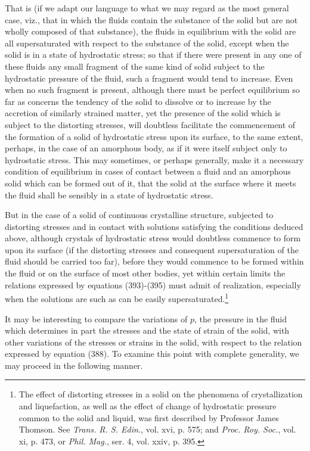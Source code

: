 \documentclass[12pt]{article}
\begin{document}
{That is (if we adapt our language to what we may regard as the most general case, viz., that in which the fluids contain the substance of the solid but are not wholly composed of that substance), the fluids in equilibrium with the solid are all supersaturated with respect to the substance of the solid, except when the solid is in a state of hydrostatic stress; so that if there were present in any one of these fluids any small fragment of the same kind of solid subject to the hydrostatic pressure of the fluid, such a fragment would tend to increase. Even when no such fragment is present, although there must be perfect equilibrium so far as concerns the tendency of the solid to dissolve or to increase by the accretion of similarly strained matter, yet the presence of the solid which is subject to the distorting stresses, will doubtless facilitate the commencement of the formation of a solid of hydrostatic stress upon its surface, to the same extent, perhaps, in the case of an amorphous body, as if it were itself subject only to hydrostatic stress. This may sometimes, or perhaps generally, make it a necessary condition of equilibrium in cases of contact between a fluid and an amorphous solid which can be formed out of it, that the solid at the surface where it meets the fluid shall be sensibly in a state of hydrostatic stress.


But in the case of a solid of continuous crystalline structure, subjected to distorting stresses and in contact with solutions satisfying the conditions deduced above, although crystals of hydrostatic stress would doubtless commence to form upon its surface (if the distorting stresses and consequent supersaturation of the fluid should be carried too far), before they would commence to be formed within the fluid or on the surface of most other bodies, yet within certain limits the relations expressed by equations (393)-(395) must admit of realization, especially when the solutions are such as can be easily supersaturated.\footnote{The effect of distorting stresses in a solid on the phenomena of crystallization and liquefaction, as well as the effect of change of hydrostatic pressure common to the solid and liquid, was first described by Professor James Thomson. See \textit{Trans. R. S. Edin.}, vol. xvi, p. 575; and \textit{Proc. Roy. Soc.}, vol. xi, p. 473, or \textit{Phil. Mag.}, ser. 4, vol. xxiv, p. 395.} 


It may be interesting to compare the variations of $p$, the pressure in the fluid which determines in part the stresses and the state of strain of the solid, with other variations of the stresses or strains in the solid, with respect to the relation expressed by equation (388). To examine this point with complete generality, we may proceed in the following manner.


}
\end{document}
